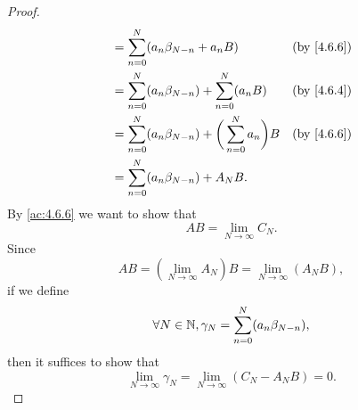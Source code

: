 \begin{proof}
\begin{align*}
                          & = \sum_{n = 0}^N (a_n \beta_{N - n} + a_n B)                            & \text{(by \cref{4.6.6})} \\
                          & = \sum_{n = 0}^N (a_n \beta_{N - n}) + \sum_{n = 0}^N (a_n B)           & \text{(by \cref{4.6.4})} \\
                          & = \sum_{n = 0}^N (a_n \beta_{N - n}) + \bigg(\sum_{n = 0}^N a_n\bigg) B & \text{(by \cref{4.6.6})} \\
                          & = \sum_{n = 0}^N (a_n \beta_{N - n}) + A_N B.
  \end{align*}
  By \cref{ac:4.6.6} we want to show that
  \[
    AB = \lim_{N \to \infty} C_N.
  \]
  Since
  \[
    AB = (\lim_{N \to \infty} A_N) B = \lim_{N \to \infty} (A_N B),
  \]
  if we define
  \[
    \forall N \in \mathbb{N}, \gamma_N = \sum_{n = 0}^N (a_n \beta_{N - n}),
  \]
  then it suffices to show that
  \[
    \lim_{N \to \infty} \gamma_N = \lim_{N \to \infty} (C_N - A_N B) = 0.
  \]


\end{proof}
